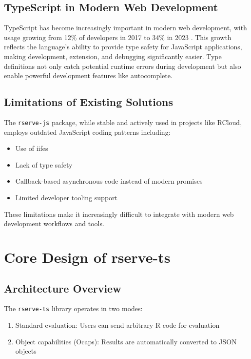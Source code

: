 \documentclass{article}
\newcommand{\pkg}[1]{\texttt{#1}}
\newcommand{\prog}[1]{{\sf #1}}
\newcommand{\proglang}[1]{\prog{#1}}
\newcommand{\R}{\prog{R}}
\begin{document}

\subsection{TypeScript in Modern Web Development}
\label{sec:typescript}

TypeScript has become increasingly important in modern web development, with usage growing from 12\% of developers in 2017 to 34\% in 2023 \parencite{JetBrains2023}. This growth reflects the language's ability to provide type safety for JavaScript applications, making development, extension, and debugging significantly easier. Type definitions not only catch potential runtime errors during development but also enable powerful development features like autocomplete.

\subsection{Limitations of Existing Solutions}
\label{sec:limitations}

The \pkg{rserve-js} package, while stable and actively used in projects like \proglang{RCloud}, employs outdated JavaScript coding patterns including:
\begin{itemize}
    \item Use of \glspl{iife}
    \item Lack of type safety
    \item Callback-based asynchronous code instead of modern promises
    \item Limited developer tooling support
\end{itemize}

These limitations make it increasingly difficult to integrate with modern web development workflows and tools.

\section{Core Design of rserve-ts}
\label{sec:design}

\subsection{Architecture Overview}
\label{sec:architecture}

The \pkg{rserve-ts} library operates in two modes:
\begin{enumerate}
    \item Standard evaluation: Users can send arbitrary \R{} code for evaluation
    \item Object capabilities (Ocaps): Results are automatically converted to JSON objects
\end{enumerate}
\end{document}
